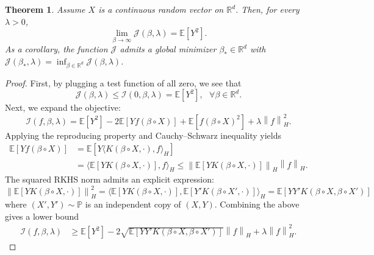 \documentclass[sn-mathphys-num]{sn-jnl}%
\numberwithin{equation}{section}
\newcommand{\R}{\mathbb{R}}
\newcommand{\E}{\mathbb{E}}
\newcommand{\kernel}{K}
\newcommand{\norm}[1]{\left\|{#1}\right\|} %
\renewcommand{\P}{\mathbb{P}}
\theoremstyle{thmstyleone}%
\newtheorem{theorem}{Theorem}%
\theoremstyle{thmstyletwo}%
\theoremstyle{thmstylethree}%
\begin{document}
\vspace{.5em} 
\begin{theorem}
\label{theorem:existence-of-global-minimizers}
Assume $X$ is a continuous random vector on $\R^d$. Then, for every $\lambda > 0$,
\begin{equation*}
	\lim_{\beta \to \infty} \mathcal{J}(\beta, \lambda) = \E[Y^2]. 
\end{equation*}
As a corollary, the function $\mathcal{J}$ admits a global minimizer $\beta_* \in \R^d$ with $\mathcal{J}(\beta_*, \lambda) = \inf_{\beta \in \R^d} \mathcal{J}(\beta, \lambda)$.
\end{theorem}
\begin{proof} 
First, by plugging a test function of all zero, we see that 
\begin{equation*}
	\mathcal{J}(\beta, \lambda) \le \mathcal{I}(0, \beta, \lambda) = \E[Y^2],~~~\forall \beta \in \R^d. 
\end{equation*}
Next, we expand the objective: 
\begin{equation*}
	\mathcal{I}(f, \beta, \lambda) = \E[Y^2] - 2\E[Y f(\beta \circ X)] + \E[f(\beta \circ X)^2] + \lambda \norm{f}_H^2.
\end{equation*}
Applying the reproducing property and Cauchy–Schwarz inequality yields
\begin{equation*}
\begin{split}
	\E[Y f(\beta \circ X)] &= \E[Y \langle \kernel(\beta \circ X, \cdot), f \rangle_H] \\
		&= \langle \E[Y  \kernel(\beta \circ X, \cdot)], f \rangle_H
		\le \norm{\E[Y  \kernel(\beta \circ X, \cdot)]}_H \norm{f}_H.
\end{split}
\end{equation*}
The squared RKHS norm admits an explicit expression: 
\begin{equation*}
	\norm{\E[Y  \kernel(\beta \circ X, \cdot)]}_H^2 
		= \langle \E[Y  \kernel(\beta \circ X, \cdot)], \E[Y'  \kernel(\beta \circ X', \cdot)]\rangle_H
		= \E[YY'\kernel(\beta \circ X, \beta \circ X')]
\end{equation*} 
where $(X', Y') \sim \P$ is an independent copy of $(X, Y)$. 
Combining the above gives a lower bound 
\begin{equation*}
\begin{split} 
	\mathcal{I}(f, \beta, \lambda) %
		&\ge \E[Y^2] - 2 \sqrt{\E[YY' \kernel(\beta \circ X, \beta \circ X')]} \norm{f}_H + \lambda \norm{f}_H^2.

\end{split}
\end{equation*}
\end{proof}
\end{document}
